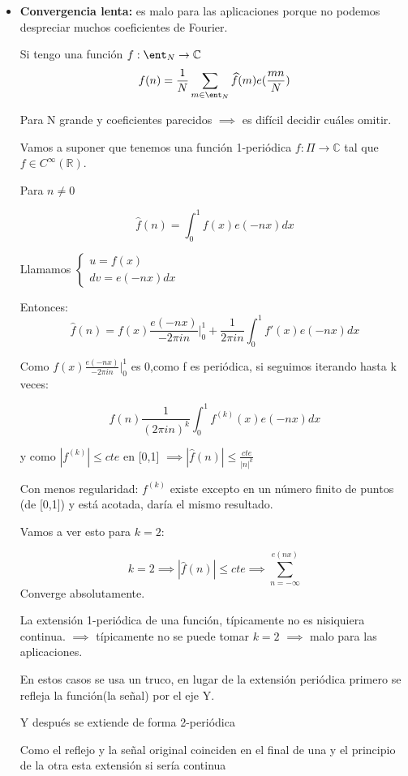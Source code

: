 \begin{itemize}
	\item \textbf{Convergencia lenta:} es malo para las aplicaciones porque no podemos despreciar muchos coeficientes de Fourier.
	
	Si tengo una función $f: \ent_N \rightarrow \mathbb{C}$
	$$f(n) = \frac{1}{N}\sum_{m \in \ent_N}\widehat{f}(m)e(\frac{mn}{N})$$
	
	Para N grande y coeficientes parecidos $\implies$ es difícil decidir cuáles omitir.
	
	Vamos a suponer que tenemos una función 1-periódica $f : \Pi \rightarrow \mathbb{C}$ tal que $f \in C^{\infty}(\mathbb{R})$.
	
	Para $n \neq 0$
	
	$$\widehat{f}(n) = \int_{0}^{1} f(x) e(-nx) dx$$
	
	Llamamos $\begin{cases}
	u = f(x)\\
	dv = e(-nx) dx
	\end{cases}$
	
	Entonces:
	$$\widehat{f}(n) = f(x) \frac{e(-nx)}{-2\pi in}|_{0}^1 + \frac{1}{2\pi i n} \int_{0}^1 f'(x) e(-nx) dx$$
	
	Como $f(x) \frac{e(-nx)}{-2\pi in}|_{0}^1 $ es 0,como f es periódica, si seguimos iterando hasta k veces:
	
	$$\widehat{f}(n)  \frac{1}{(2\pi i n)^k} \int_{0}^1 f^{(k)}(x) e(-nx) dx$$
	
	y como $|f^{(k)}| \leq cte$ en [0,1] $\implies |\widehat{f}(n)| \leq \frac{cte}{|n|^k}$
	
	Con menos regularidad: $f^{(k)}$ existe excepto en un número finito de puntos (de [0,1]) y está acotada, daría el mismo resultado.
	
	Vamos a ver esto para $k=2$:
	
	$$k=2 \implies |\widehat{f}(n)| \leq cte \implies \sum_{n= -\infty}^{e(nx)}$$
	Converge absolutamente.
	
	
	La extensión 1-periódica de una función, típicamente no es nisiquiera continua. $\implies$ típicamente no se puede tomar $k=2$ $\implies$ malo para las aplicaciones.
	
	En estos casos se usa un truco, en lugar de la extensión periódica primero se refleja la función(la señal) por el eje Y.
	
	Y después se extiende de forma 2-periódica
	
	Como el reflejo y la señal original coinciden en el final de una y el principio de la otra esta extensión si sería continua
	

\end{itemize}
